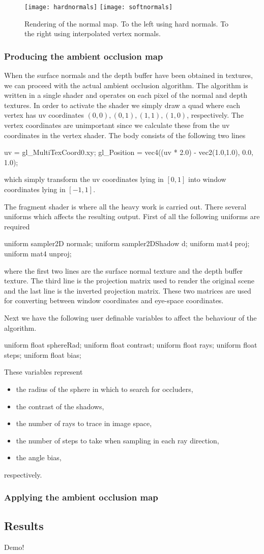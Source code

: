 \begin{figure}[h]
  \centering
  \texttt{[image: hardnormals]}
  \texttt{[image: softnormals]}
  \caption{Rendering of the normal map. To the left using hard
    normals. To the right using interpolated vertex normals.}
  \label{fig:normals}
\end{figure}
\subsubsection*{Producing the ambient occlusion map}  
When the surface normals and the depth buffer have been obtained in
textures, we can proceed with the actual ambient occlusion
algorithm. The algorithm is written in a single shader and operates on
each pixel of the normal and depth textures. In order to activate the
shader we simply draw a quad where each vertex has uv coordinates
$(0,0), (0,1), (1,1), (1,0)$, respectively. The vertex coordinates are
unimportant since we calculate these from the uv coordinates in the
vertex shader. The body consists of the following two lines
\begin{cppcode}
  uv = gl_MultiTexCoord0.xy;
  gl_Position = vec4((uv * 2.0) - vec2(1.0,1.0), 0.0, 1.0);
\end{cppcode}
which simply transform the uv coordinates lying in $[0,1]$ into window
coordinates lying in $[-1,1]$.

The fragment shader is where all the heavy work is carried out. There
several uniforms which affects the resulting output. First of all the
following uniforms are required
\begin{cppcode}
  uniform sampler2D normals;
  uniform sampler2DShadow d;
  uniform mat4 proj;
  uniform mat4 unproj;
\end{cppcode}
where the first two lines are the surface normal texture and the depth
buffer texture. The third line is the projection matrix used to render
the original scene and the last line is the inverted projection
matrix. These two matrices are used for converting between window
coordinates and eye-space coordinates.

Next we have the following user definable variables to affect the
behaviour of the algorithm.
\begin{cppcode}
  uniform float sphereRad;
  uniform float contrast;
  uniform float rays;
  uniform float steps;
  uniform float bias;
\end{cppcode}
These variables represent
\begin{itemize}
\item the radius of the sphere in which to search for occluders,
\item the contrast of the shadows,
\item the number of rays to trace in image space,
\item the number of steps to take when sampling in each ray direction,
\item the angle bias, 
\end{itemize}
respectively.


\subsubsection*{Applying the ambient occlusion map}


\subsection{Results}
Demo!

